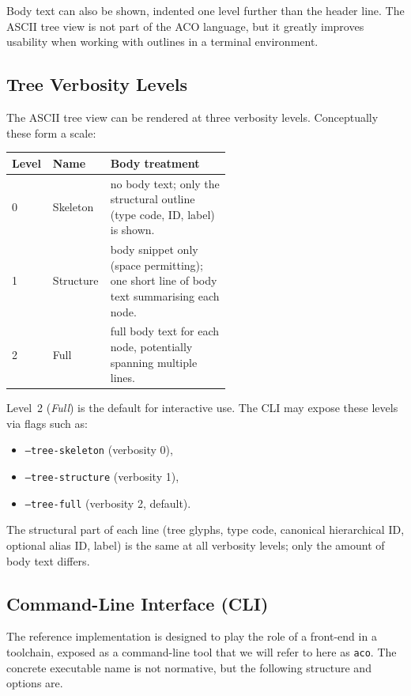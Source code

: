 \documentclass[11pt]{article}
\begin{document}
Body text can also be shown, indented one level further than the header line. The ASCII tree view is not part of the ACO language, but it greatly improves usability when working with outlines in a terminal environment.

\subsection*{Tree Verbosity Levels}

The ASCII tree view can be rendered at three verbosity levels. Conceptually these form a scale:

\begin{center}
\begin{tabular}{llp{0.55\linewidth}}
\textbf{Level} & \textbf{Name}     & \textbf{Body treatment} \\
\hline
0 & Skeleton  & no body text; only the structural outline (type code, ID, label) is shown. \\
1 & Structure & body snippet only (space permitting); one short line of body text summarising each node. \\
2 & Full      & full body text for each node, potentially spanning multiple lines. \\
\end{tabular}
\end{center}

Level~2 (\emph{Full}) is the default for interactive use. The CLI may expose these levels via flags such as:

\begin{itemize}[leftmargin=2em]
  \item \texttt{--tree-skeleton} (verbosity 0),
  \item \texttt{--tree-structure} (verbosity 1),
  \item \texttt{--tree-full} (verbosity 2, default).
\end{itemize}

The structural part of each line (tree glyphs, type code, canonical hierarchical ID, optional alias ID, label) is the same at all verbosity levels; only the amount of body text differs.

\subsection*{Command-Line Interface (CLI)}

The reference implementation is designed to play the role of a front-end in a toolchain, exposed as a command-line tool that we will refer to here as \texttt{aco}. The concrete executable name is not normative, but the following structure and options are.
\end{document}
